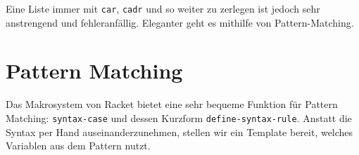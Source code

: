 Eine Liste immer mit \texttt{car}, \texttt{cadr} und so weiter zu zerlegen ist jedoch sehr anstrengend und fehleranfällig. Eleganter geht es mithilfe von Pattern-Matching. %

% 
% 
% 
% 
% 
%   

\section{Pattern Matching}
Das Makrosystem von Racket bietet eine sehr bequeme Funktion für Pattern Matching: \texttt{syntax-case} und dessen Kurzform \texttt{define-syntax-rule}. Anstatt die Syntax per Hand auseinanderzunehmen, stellen wir ein Template bereit, welches Variablen aus dem Pattern nutzt.

